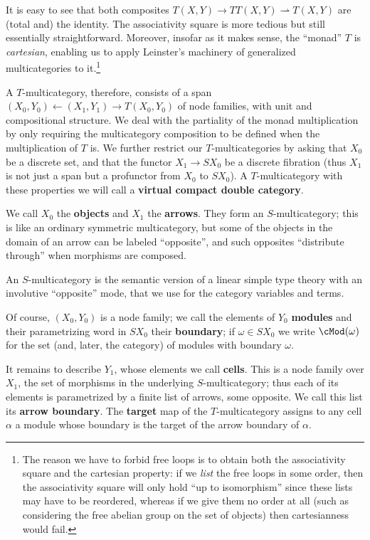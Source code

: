 \documentclass{amsart}
\begin{document}
It is easy to see that both composites $T(X,Y) \to TT(X,Y) \rightharpoonup T(X,Y)$ are (total and) the identity.
The associativity square is more tedious but still essentially straightforward.
Moreover, insofar as it makes sense, the ``monad'' $T$ is \emph{cartesian}, enabling us to apply Leinster's machinery of generalized multicategories to it.\footnote{The reason we have to forbid free loops is to obtain both the associativity square and the cartesian property: if we \emph{list} the free loops in some order, then the associativity square will only hold ``up to isomorphism'' since these lists may have to be reordered, whereas if we give them no order at all (such as considering the free abelian group on the set of objects) then cartesianness would fail.}

A $T$-multicategory, therefore, consists of a span $(X_0,Y_0) \leftarrow (X_1,Y_1) \to T(X_0,Y_0)$ of node families, with unit and compositional structure.
We deal with the partiality of the monad multiplication by only requiring the multicategory composition to be defined when the multiplication of $T$ is.
We further restrict our $T$-multicategories by asking that $X_0$ be a discrete set, and that the functor $X_1 \to S X_0$ be a discrete fibration (thus $X_1$ is not just a span but a profunctor from $X_0$ to $S X_0$).
A $T$-multicategory with these properties we will call a \textbf{virtual compact double category}.

We call $X_0$ the \textbf{objects} and $X_1$ the \textbf{arrows}.
They form an $S$-multicategory; this is like an ordinary symmetric multicategory, but some of the objects in the domain of an arrow can be labeled ``opposite'', and such opposites ``distribute through'' when morphisms are composed.
\begin{tcolorbox}[title=Added Mar 18]
  An $S$-multicategory is the semantic version of a linear simple type theory with an involutive ``opposite'' mode, that we use for the category variables and terms.
\end{tcolorbox}
Of course, $(X_0,Y_0)$ is a node family; we call the elements of $Y_0$ \textbf{modules} and their parametrizing word in $SX_0$ their \textbf{boundary}; if $\omega\in SX_0$ we write $\cMod(\omega)$ for the set (and, later, the category) of modules with boundary $\omega$.

It remains to describe $Y_1$, whose elements we call \textbf{cells}.
This is a node family over $X_1$, the set of morphisms in the underlying $S$-multicategory; thus each of its elements is parametrized by a finite list of arrows, some opposite.
We call this list its \textbf{arrow boundary}.
The \textbf{target} map of the $T$-multicategory assigns to any cell $\alpha$ a module whose boundary is the target of the arrow boundary of $\alpha$.
\end{document}
